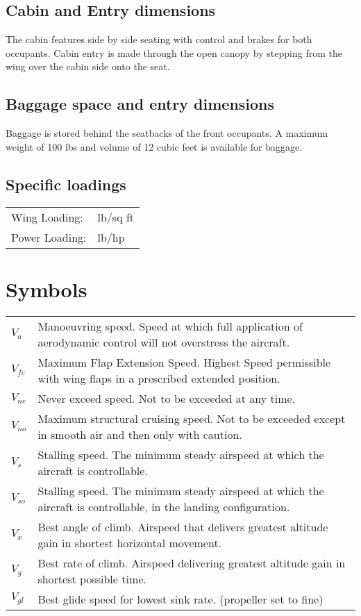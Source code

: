 \subsection{Cabin and Entry dimensions}
The cabin features side by side seating with control and  brakes for both occupants.   Cabin entry is made through the open canopy by stepping from the wing over the cabin side onto the seat.

\subsection{Baggage space and entry dimensions}
Baggage is stored behind the seatbacks of the front occupants.  A maximum weight of 100 lbs and volume of 12 cubic feet is available for baggage.

\subsection{Specific loadings}
  \begin{tabularx}{\linewidth}{
    >{\hsize=0.4\hsize}X
    >{\hsize=0.6\hsize}X  }
Wing Loading: & 14.8 lb/sq ft\\
Power Loading: & 9.0 lb/hp \\
\end{tabularx}

\section{Symbols}
  \begin{tabularx}{\linewidth}{
    >{\hsize=0.2\hsize}X
    >{\hsize=0.8\hsize}X  }
$V_{a}$    & Manoeuvring speed. Speed at which full application of aerodynamic control will not overstress the aircraft. \\
$V_{fe}$ & Maximum Flap Extension Speed. Highest Speed permissible with wing flaps in a prescribed extended position. \\
$V_{ne}$ & Never exceed speed. Not to be exceeded at any time. \\
$V_{no}$ & Maximum structural cruising speed. Not to be exceeded except in smooth air and then only with caution.\\ 
$V_{s}$  & Stalling speed. The minimum steady airspeed at which the aircraft is controllable. \\
$V_{so}$ & Stalling speed. The minimum steady airspeed at which the aircraft is controllable, in the landing configuration. \\
$V_{x}$  & Best angle of climb. Airspeed that delivers greatest altitude gain in shortest horizontal movement. \\
$V_{y}$  & Best rate of climb. Airspeed delivering greatest altitude gain in shortest possible time.\\
$V_{gl}$ & Best glide speed for lowest sink rate. (propeller set to fine)\\
\end{tabularx}


